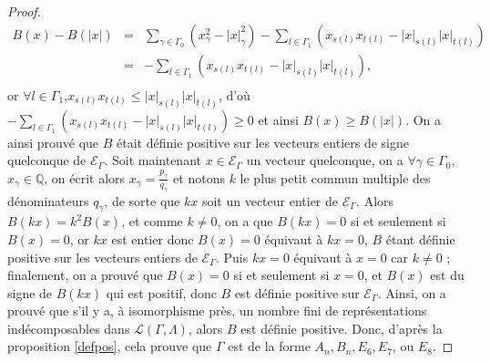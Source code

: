 \documentclass[a4paper,11pt]{article}
\newcommand{\EG}{\mathscr{E}_\Gamma}
\begin{document}
\begin{proof}
	\begin{eqnarray*}
		B(x)-B(|x|)&=&\sum_{\gamma\in\Gamma_0}\left(x_\gamma^2-|x|_{\gamma}^2\right)-\sum_{l\in\Gamma_1}\left(x_{s(l)}x_{t(l)}-|x|_{s(l)}|x|_{t(l)}\right)\\
		&=&-\sum_{l\in\Gamma_1}\left(x_{s(l)}x_{t(l)}-|x|_{s(l)}|x|_{t(l)}\right),\\
	\end{eqnarray*}
	or $\forall l\in\Gamma_1$,$x_{s(l)}x_{t(l)}\leq|x|_{s(l)}|x|_{t(l)}$, d'où $-\sum_{l\in\Gamma_1}\left(x_{s(l)}x_{t(l)}-|x|_{s(l)}|x|_{t(l)}\right)\geq0$ et ainsi $B(x)\geq B(|x|)$. On a ainsi prouvé que $B$ était définie positive sur les vecteurs entiers de signe quelconque de $\EG$. Soit maintenant $x\in\EG$ un vecteur quelconque, on a $\forall\gamma\in\Gamma_0$, $x_{\gamma}\in\mathbb Q$, on écrit alors $x_\gamma=\frac{p_\gamma}{q_\gamma}$ et notons $k$ le plus petit commun multiple des dénominateurs $q_\gamma$, de sorte que $kx$ soit un vecteur entier de $\EG$. Alors $B(kx)=k^2B(x)$, et comme $k\neq0$, on a que $B(kx)=0$ si et seulement si $B(x)=0$, or $kx$ est entier donc $B(x)=0$ équivaut à $kx=0$, $B$ étant définie positive sur les vecteurs entiers de $\EG$. Puis $kx=0$ équivaut à $x=0$ car $k\neq0$ ; finalement, on a prouvé que $B(x)=0$ si et seulement si $x=0$, et $B(x)$ est du signe de $B(kx)$ qui est positif, donc $B$ est définie positive sur $\EG$. Ainsi, on a prouvé que s'il y a, à isomorphisme près, un nombre fini de représentations indécomposables dans $\mathscr L(\Gamma,\Lambda)$, alors $B$ est définie positive. Donc, d'après la proposition \ref{defpos}, cela prouve que $\Gamma$ est de la forme $A_n,B_n,E_6,E_7$, ou $E_8$.


\end{proof}
\end{document}
